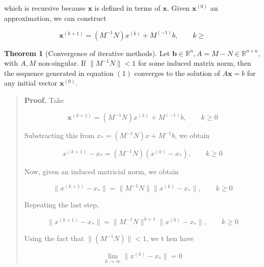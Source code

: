 \documentclass[12pt]{article}
\theoremstyle{definition}
\newtheorem{theorem}{Theorem}
\begin{document}
which is recursive because $\textbf{x}$ is defined in terms of $\textbf{x}$.
Given $\textbf{x}^{(0)}$ an approximation, we can construct 

\begin{equation}
    \textbf{x}^{(k+1)} = \left( M^{-1}N \right) x^{(k)} + M^{(-1)}b, \qquad k
    \geq 
\end{equation}

\begin{theorem}[Convergence of iterative methods]
    Let $\textbf{b} \in \mathbb{R}^n, A = M - N \in \mathbb{R}^{n \times  n}$,
    with $A, M$ non-singular. If $\|M^{-1} N\| < 1$ for some induced matrix
    norm, then the sequence generated in equation $(1)$ converges to the
    solution of $A\textbf{x} = b$ for any initial vector $\textbf{x}^{(0)}$.
\end{theorem}


\small
\begin{quote}

\textbf{Proof.} Take 

\begin{equation}
    \textbf{x}^{(k+1)} =  (M^{-1}N)x^{(k)} + M^{(-1)}b, \qquad k \geq 0
\end{equation}

Substracting this from $x_* = (M^{-1} N)x + M^{-1}b$, we obtain 

\begin{equation}
    x^{(k+1)} - x_* = (M^{-1} N)(x^{(k)} - x_*), \qquad k \geq 0
\end{equation}

Now, given an induced matricial norm, we obtain 

\begin{equation}
    \|x^{(k+1)} - x_*\| = \|M^{-1} N\| \|x^{(k)} - x_*\|, \qquad k \geq 0
\end{equation}

Repeating the last step,


\begin{equation}
    \|x^{(k+1)} - x_*\| = \|M^{-1} N\|^{k+1} \|x^{(0)} - x_*\|, \qquad k \geq 0
\end{equation}

Using the fact that $\|(M^{-1}N)\| < 1$, we t hen have

\begin{equation}
    \lim_{k \to \infty}  \|x^{(k)} - x_*\| = 0
\end{equation}

\end{quote}
\normalsize
\end{document}
